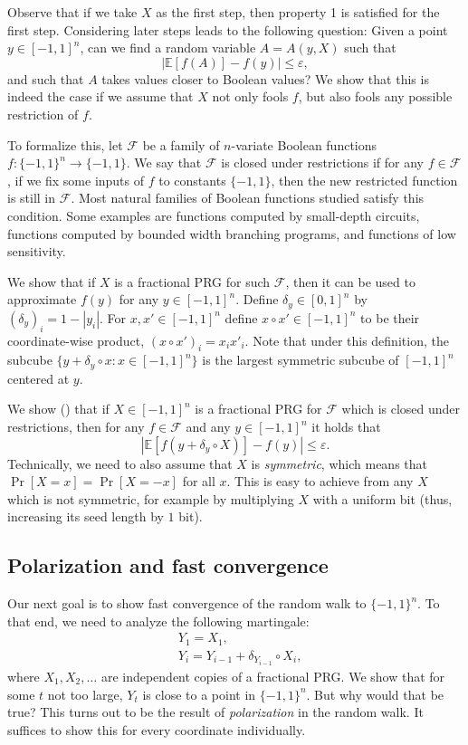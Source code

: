 \documentclass{toc}
\newcommand{\E}{\mathbb{E}}
\newcommand{\FF}{\mathcal{F}}
\newcommand{\eps}{\varepsilon}
\begin{document}
Observe that if we take $X$ as the first step, then property 1 is satisfied for the first step. Considering later steps leads to the following question: Given a point $y\in [-1,1]^n$, can we find a random variable $A=A(y,X)$ such that
$$
|\E[f(A)] - f(y)| \le \eps,
$$
and such that $A$ takes values closer to Boolean values?
We show that this is indeed the case if we assume that $X$ not only fools $f$, but also fools any possible restriction of $f$.

To formalize this, let $\FF$ be a family of $n$-variate Boolean functions $f:\{-1,1\}^n \to \{-1,1\}$. We say that $\FF$ is closed under restrictions if for any
$f \in \FF$, if we fix some inputs of $f$ to constants $\{-1,1\}$, then the new restricted function is still in $\FF$. Most natural families of Boolean functions studied
satisfy this condition. Some examples are functions computed by small-depth circuits, functions computed by bounded width branching programs, and functions
of low sensitivity.

We show that if $X$ is a fractional PRG for such $\FF$, then it can be used to approximate $f(y)$ for any $y \in [-1,1]^n$. Define $\delta_y \in [0,1]^n$ by
$(\delta_y)_i = 1 - |y_i|$. For $x,x' \in [-1,1]^n$ define $x \circ x' \in [-1,1]^n$ to be their coordinate-wise product, $(x \circ x')_i = x_i x'_i$.
Note that under this definition, the subcube $\{y + \delta_y \circ x: x \in [-1,1]^n\}$ is the largest symmetric subcube of $[-1,1]^n$ centered at $y$.

We show () that if $X \in [-1,1]^n$ is a fractional PRG for $\FF$ which is closed under restrictions, then for any
$f \in \FF$ and any $y \in [-1,1]^n$ it holds that
$$
|\E[f(y + \delta_y \circ X)] - f(y)| \le \eps.
$$
Technically, we need to also assume that $X$ is \emph{symmetric}, which means that $\Pr[X=x]=\Pr[X=-x]$ for all $x$. This is easy to achieve
from any $X$ which is not symmetric, for example by multiplying
$X$ with a uniform bit (thus, increasing its seed length by $1$ bit).

\subsection{Polarization and fast convergence}
Our next goal is to show fast convergence of the random walk to $\{-1,1\}^n$. To that end, we need
to analyze the following martingale:
\begin{align*}
&Y_1=X_1,\\
&Y_i=Y_{i-1} + \delta_{Y_{i-1}} \circ X_i,
\end{align*}
where $X_1,X_2,\ldots$ are independent copies of a fractional PRG\@. We show that for some $t$ not too large, $Y_t$ is close to a point in $\{-1,1\}^n$.
But why would that be true? This turns out to be the result of \emph{polarization} in the random walk. It suffices to show this for every coordinate individually.
\end{document}
